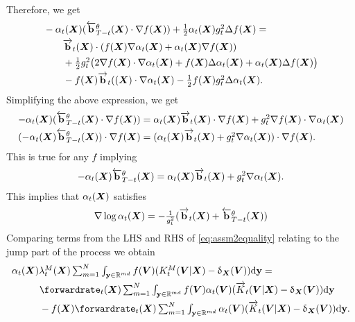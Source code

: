 Therefore, we get 
\begin{align}
    &\textstyle -\alpha_t({\bm{X}}) (\overleftarrow{\mathbf{b}}_{T-t}^\theta({\bm{X}}) \cdot \nabla f({\bm{X}})) + \frac{1}{2} \alpha_t({\bm{X}}) g_t^2 \Delta f({\bm{X}}) = \\
    &\textstyle  \quad \quad \overrightarrow{\mathbf{b}}_t({\bm{X}}) \cdot ( f({\bm{X}}) \nabla \alpha_t({\bm{X}}) + \alpha_t({\bm{X}}) \nabla f({\bm{X}})) \\
  &\textstyle \quad \quad + \frac{1}{2} g_t^2 \big( 2 \nabla f({\bm{X}}) \cdot \nabla \alpha_t({\bm{X}}) +f({\bm{X}}) \Delta \alpha_t({\bm{X}}) + \alpha_t ({\bm{X}}) \Delta f({\bm{X}}) \big) \\
    &\textstyle  \quad \quad - f({\bm{X}}) \overrightarrow{\mathbf{b}}_t(({\bm{X}}) \cdot \nabla \alpha_t({\bm{X}}) - \frac{1}{2} f({\bm{X}}) g_t^2 \Delta \alpha_t({\bm{X}}) . 
\end{align}
Simplifying the above expression, we get
\begin{align}
    -\alpha_t({\bm{X}}) ( \overleftarrow{\mathbf{b}}_{T-t}^\theta({\bm{X}}) \cdot \nabla f({\bm{X}})) &\textstyle = \alpha_t({\bm{X}}) \overrightarrow{\mathbf{b}}_t({\bm{X}}) \cdot \nabla f({\bm{X}}) + g_t^2 \nabla f({\bm{X}}) \cdot \nabla \alpha_t({\bm{X}})\\
    (-\alpha_t({\bm{X}}) \overleftarrow{\mathbf{b}}_{T-t}^\theta({\bm{X}})) \cdot \nabla f({\bm{X}}) &\textstyle = ( \alpha_t({\bm{X}}) \overrightarrow{\mathbf{b}}_t({\bm{X}}) + g_t^2 \nabla \alpha_t({\bm{X}}) ) \cdot \nabla f({\bm{X}}) . 
\end{align}
This is true for any $f$ implying
\begin{align}
    -\alpha_t({\bm{X}}) \overleftarrow{\mathbf{b}}_{T-t}^\theta({\bm{X}}) = \alpha_t({\bm{X}}) \overrightarrow{\mathbf{b}}_t({\bm{X}}) + g_t^2 \nabla \alpha_t({\bm{X}}) . 
\end{align}
This implies that $\alpha_t({\bm{X}})$ satisfies 
\begin{equation}
  \textstyle 
    \nabla \log \alpha_t({\bm{X}}) = - \frac{1}{g_t^2} ( \overrightarrow{\mathbf{b}}_t({\bm{X}}) + \overleftarrow{\mathbf{b}}_{T-t}^\theta ({\bm{X}}))
    \label{eq:alphaDiffRelation}
\end{equation}
Comparing terms from the LHS and RHS of \eqref{eq:assm2equality} relating to the jump part of the process we obtain
\begin{align}
    &\textstyle \alpha_t(\mX) \mrate_t(\mX) \inty f(\mV) ( \mtk_t(\mV | \mX) - \updelta_{\mX}(\mV) ) \rmd \y = \\
    &\textstyle  \hspace{1cm} \forwardrate_t(\mX) \inty f(\mV) \alpha_t(\mV) ( \ftk_t(\mV | \mX) - \updelta_{\mX}(\mV) ) \rmd \y\\
    &\textstyle  \hspace{1cm} - f(\mX) \forwardrate_t(\mX) \inty \alpha_t(\mV) ( \ftk_t(\mV | \mX) - \updelta_{\mX}(\mV) ) \rmd \y .
\end{align}
